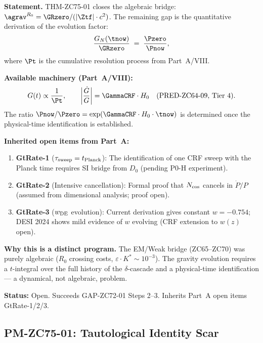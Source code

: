\documentclass[12pt, a4paper]{article}
\begin{document}
\begin{openqbox}[title={GAP-ZC75-01: Cosmological Evolution Factor
  $P(\tnow)/P(0)$ (Open; Gravity Programme Priority~1)}]

\textbf{Statement.}
THM-ZC75-01 closes the algebraic bridge:
$\agrav^{R_0} = \GRzero/(|\Ztf| \cdot c^2)$.
The remaining gap is the quantitative derivation of the evolution
factor:
\[
  \frac{G_N(\tnow)}{\GRzero}
  \;=\; \frac{\Pzero}{\Pnow},
\]
where $\Pt$ is the cumulative resolution process from Part~A/VIII.

\textbf{Available machinery (Part~A/VIII):}
\[
  G(t) \propto \frac{1}{\Pt}, \qquad
  \left|\frac{\dot{G}}{G}\right| = \GammaCRF \cdot H_0
  \quad\text{(PRED-ZC64-09, Tier~4)}.
\]
The ratio $\Pnow/\Pzero = \exp(\GammaCRF \cdot H_0 \cdot \tnow)$
is determined once the physical-time identification is established.

\textbf{Inherited open items from Part~A:}
\begin{enumerate}[leftmargin=2em, noitemsep]
  \item \textbf{GtRate-1} ($\tau_{\rm sweep} = t_{\rm Planck}$):
    The identification of one CRF sweep with the Planck time
    requires SI bridge from $D_0$ (pending P0-H experiment).
  \item \textbf{GtRate-2} (Intensive cancellation):
    Formal proof that $N_{\rm cos}$ cancels in $\dot{P}/P$
    (assumed from dimensional analysis; proof open).
  \item \textbf{GtRate-3} ($w_{\rm DE}$ evolution):
    Current derivation gives constant $w = -0.754$;
    DESI 2024 shows mild evidence of $w$ evolving
    (CRF extension to $w(z)$ open).
\end{enumerate}

\textbf{Why this is a distinct program.}
The EM/Weak bridge (ZC65--ZC70) was purely algebraic ($R_0$
crossing costs, $\varepsilon \cdot K^* \sim 10^{-3}$).
The gravity evolution requires a $t$-integral over the full
history of the $\delta$-cascade and a physical-time identification
--- a dynamical, not algebraic, problem.

\textbf{Status:} Open. Succeeds GAP-ZC72-01 Steps 2--3.
Inherits Part~A open items GtRate-1/2/3.
\end{openqbox}

\subsection{PM-ZC75-01: Tautological Identity Scar}
\label{sec:pm}
\end{document}
